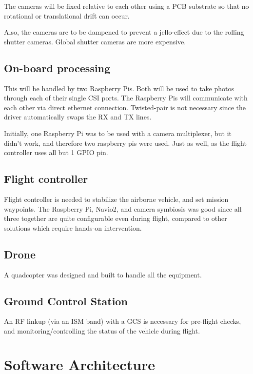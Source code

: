 The cameras will be fixed relative to each other using a PCB substrate so that no rotational or translational drift can occur.

Also, the cameras are to be dampened to prevent a jello-effect due to the rolling shutter cameras. Global shutter cameras are more expensive.

\subsection{On-board processing}

This will be handled by two Raspberry Pis. Both will be used to take photos through each of their single CSI ports. The Raspberry Pis will communicate with each other via direct ethernet connection. Twisted-pair is not necessary since the driver automatically swaps the RX and TX lines.

Initially, one Raspberry Pi was to be used with a camera multiplexer, but it didn't work, and therefore two raspberry pis were used. Just as well, as the flight controller uses all but 1 GPIO pin.

\subsection{Flight controller}

Flight controller is needed to stabilize the airborne vehicle, and set mission waypoints. The Raspberry Pi, Navio2, and camera symbiosis was good since all three together are quite configurable even during flight, compared to other solutions which require hands-on intervention.

\subsection{Drone}

A quadcopter was designed and built to handle all the equipment.

\subsection{Ground Control Station}

An RF linkup (via an ISM band) with a GCS is necessary for pre-flight checks, and monitoring/controlling the status of the vehicle during flight.

\section{Software Architecture}


